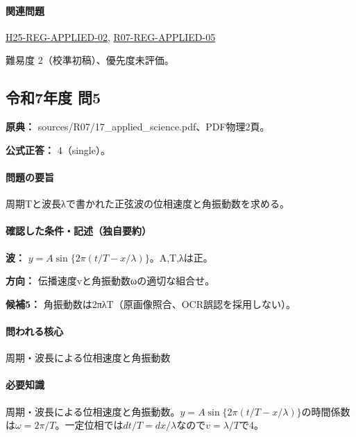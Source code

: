 \paragraph{関連問題} \hyperref[q:h25-reg-applied-02]{H25-REG-APPLIED-02}, \hyperref[q:r07-reg-applied-05]{R07-REG-APPLIED-05}

\par 難易度 2（校準初稿）、優先度未評価。

\subsection{令和7年度 問5}
\label{q:r07-reg-applied-05}

\noindent\textbf{原典：} sources/R07/17\_applied\_science.pdf、PDF物理2頁。

\textbf{公式正答：} 4（single）。

\paragraph{問題の要旨} 周期Tと波長λで書かれた正弦波の位相速度と角振動数を求める。

\paragraph{確認した条件・記述（独自要約）}\mbox{}\par

\noindent\textbf{波：} \(y=A\sin\{2\pi(t/T-x/\lambda)\}\)。A,T,λは正。\par

\noindent\textbf{方向：} 伝播速度vと角振動数ωの適切な組合せ。\par

\noindent\textbf{候補5：} 角振動数は2πλT（原画像照合、OCR誤認を採用しない）。\par

\paragraph{問われる核心} 周期・波長による位相速度と角振動数

\paragraph{必要知識} 周期・波長による位相速度と角振動数。\(y=A\sin\{2\pi(t/T-x/\lambda)\}\)の時間係数は\(\omega=2\pi/T\)。一定位相では\(dt/T=dx/\lambda\)なので\(v=\lambda/T\)で4。

